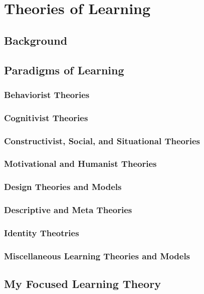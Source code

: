 \chapter[Chapter 2: Theories of Learning]{Theories of Learning}

\section{Background}

\section{Paradigms of Learning}

\subsection{Behaviorist Theories}
\subsection{Cognitivist Theories}
\subsection{Constructivist, Social, and Situational Theories}
\subsection{Motivational and Humanist Theories}
\subsection{Design Theories and Models}
\subsection{Descriptive and Meta Theories}
\subsection{Identity Theotries}
\subsection{Miscellaneous Learning Theories and Models}

\section{My Focused Learning Theory}


